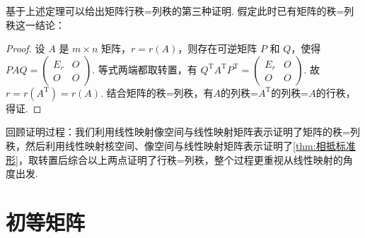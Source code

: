 
基于上述定理可以给出矩阵行秩=列秩的第三种证明. 假定此时已有矩阵的秩=列秩这一结论：

\begin{proof} \label{pf:11:矩阵行秩=列秩}
    设 $A$ 是 $m \times n$ 矩阵，$r = r(A)$，则存在可逆矩阵 $P$ 和 $Q$，使得 $PAQ = \begin{pmatrix}
        E_r & O \\ O & O
    \end{pmatrix}$. 等式两端都取转置，有 $Q^\mathrm{T}A^\mathrm{T}P^\mathrm{T} = \begin{pmatrix}
            E_r & O \\ O & O
    \end{pmatrix}$. 故 $r = r(A^\mathrm{T}) = r(A)$. 结合矩阵的秩=列秩，有$A$的列秩=$A^\mathrm{T}$的列秩=$A$的行秩，得证.
\end{proof}

回顾证明过程：我们利用线性映射像空间与线性映射矩阵表示证明了矩阵的秩=列秩，然后利用线性映射核空间、像空间与线性映射矩阵表示证明了\autoref{thm:相抵标准形}，取转置后综合以上两点证明了行秩=列秩，整个过程更重视从线性映射的角度出发.

\section{初等矩阵}

